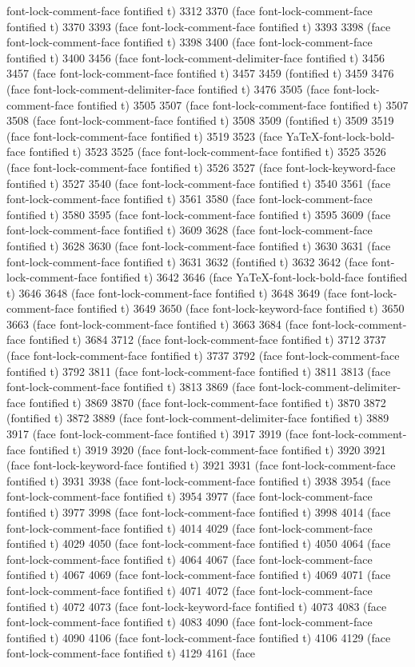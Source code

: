 {font-lock-comment-face fontified t) 3312 3370 (face font-lock-comment-face fontified t) 3370 3393 (face font-lock-comment-face fontified t) 3393 3398 (face font-lock-comment-face fontified t) 3398 3400 (face font-lock-comment-face fontified t) 3400 3456 (face font-lock-comment-delimiter-face fontified t) 3456 3457 (face font-lock-comment-face fontified t) 3457 3459 (fontified t) 3459 3476 (face font-lock-comment-delimiter-face fontified t) 3476 3505 (face font-lock-comment-face fontified t) 3505 3507 (face font-lock-comment-face fontified t) 3507 3508 (face font-lock-comment-face fontified t) 3508 3509 (fontified t) 3509 3519 (face font-lock-comment-face fontified t) 3519 3523 (face YaTeX-font-lock-bold-face fontified t) 3523 3525 (face font-lock-comment-face fontified t) 3525 3526 (face font-lock-comment-face fontified t) 3526 3527 (face font-lock-keyword-face fontified t) 3527 3540 (face font-lock-comment-face fontified t) 3540 3561 (face font-lock-comment-face fontified t) 3561 3580 (face font-lock-comment-face fontified t) 3580 3595 (face font-lock-comment-face fontified t) 3595 3609 (face font-lock-comment-face fontified t) 3609 3628 (face font-lock-comment-face fontified t) 3628 3630 (face font-lock-comment-face fontified t) 3630 3631 (face font-lock-comment-face fontified t) 3631 3632 (fontified t) 3632 3642 (face font-lock-comment-face fontified t) 3642 3646 (face YaTeX-font-lock-bold-face fontified t) 3646 3648 (face font-lock-comment-face fontified t) 3648 3649 (face font-lock-comment-face fontified t) 3649 3650 (face font-lock-keyword-face fontified t) 3650 3663 (face font-lock-comment-face fontified t) 3663 3684 (face font-lock-comment-face fontified t) 3684 3712 (face font-lock-comment-face fontified t) 3712 3737 (face font-lock-comment-face fontified t) 3737 3792 (face font-lock-comment-face fontified t) 3792 3811 (face font-lock-comment-face fontified t) 3811 3813 (face font-lock-comment-face fontified t) 3813 3869 (face font-lock-comment-delimiter-face fontified t) 3869 3870 (face font-lock-comment-face fontified t) 3870 3872 (fontified t) 3872 3889 (face font-lock-comment-delimiter-face fontified t) 3889 3917 (face font-lock-comment-face fontified t) 3917 3919 (face font-lock-comment-face fontified t) 3919 3920 (face font-lock-comment-face fontified t) 3920 3921 (face font-lock-keyword-face fontified t) 3921 3931 (face font-lock-comment-face fontified t) 3931 3938 (face font-lock-comment-face fontified t) 3938 3954 (face font-lock-comment-face fontified t) 3954 3977 (face font-lock-comment-face fontified t) 3977 3998 (face font-lock-comment-face fontified t) 3998 4014 (face font-lock-comment-face fontified t) 4014 4029 (face font-lock-comment-face fontified t) 4029 4050 (face font-lock-comment-face fontified t) 4050 4064 (face font-lock-comment-face fontified t) 4064 4067 (face font-lock-comment-face fontified t) 4067 4069 (face font-lock-comment-face fontified t) 4069 4071 (face font-lock-comment-face fontified t) 4071 4072 (face font-lock-comment-face fontified t) 4072 4073 (face font-lock-keyword-face fontified t) 4073 4083 (face font-lock-comment-face fontified t) 4083 4090 (face font-lock-comment-face fontified t) 4090 4106 (face font-lock-comment-face fontified t) 4106 4129 (face font-lock-comment-face fontified t) 4129 4161 (face }
